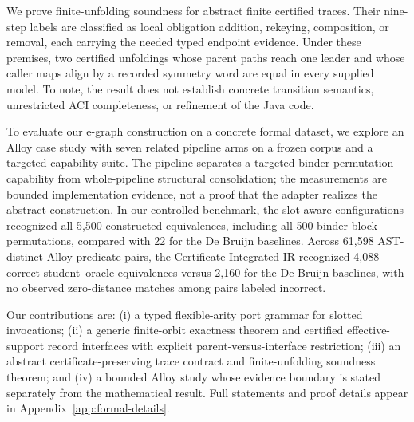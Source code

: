 We prove finite-unfolding soundness for abstract finite certified traces.
Their nine-step labels are classified as local obligation addition, rekeying,
composition, or removal, each carrying the needed typed endpoint evidence.
Under these premises, two certified unfoldings whose parent paths reach one
leader and whose caller maps align by a recorded symmetry word are equal in
every supplied model. %
To note, the result does not establish concrete transition
semantics, unrestricted ACI completeness, or refinement of the Java code.

To evaluate our e-graph construction on a concrete formal dataset, we explore an Alloy case study with seven related pipeline arms on a
frozen corpus and a targeted capability suite. The pipeline separates a targeted
binder-permutation capability from whole-pipeline structural consolidation;
the measurements are bounded implementation evidence, not a proof that
the adapter realizes the abstract construction. In our controlled benchmark, the slot-aware configurations recognized all 5,500 constructed equivalences, including all 500 binder-block permutations, compared with 22 for the De Bruijn baselines. Across 61,598 AST-distinct Alloy predicate pairs, the Certificate-Integrated IR recognized 4,088 correct student–oracle equivalences versus 2,160 for the De Bruijn baselines, with no observed zero-distance matches among pairs labeled incorrect.

Our contributions are: (i) a typed flexible-arity port grammar for slotted
invocations; (ii) a generic finite-orbit exactness theorem and certified
effective-support record interfaces with explicit parent-versus-interface
restriction; (iii) an abstract certificate-preserving trace contract and
finite-unfolding soundness theorem; and
(iv) a bounded Alloy study whose evidence boundary is stated separately from
the mathematical result.  Full statements and proof details appear in
Appendix~\ref{app:formal-details}. %
